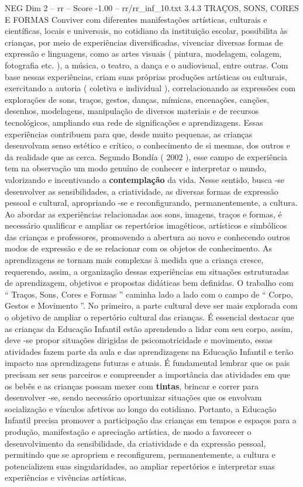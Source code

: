 \begin{textsample}{NEG Dim 2 – rr – Score -1.00 – rr/rr\_inf\_10.txt}  \label{ex:f2_neg_183}
3.4.3 TRAÇOS, SONS, CORES E FORMAS Conviver com diferentes manifestações artísticas, culturais e científicas, locais e universais, no cotidiano da instituição escolar, possibilita às crianças, por meio de experiências diversificadas, vivenciar diversas formas de expressão e linguagens, como as artes visuais ( pintura, modelagem, colagem, fotografia etc. ), a música, o teatro, a dança e o audiovisual, entre outras.
Com base nessas experiências, criam suas próprias produções artísticas ou culturais, exercitando a autoria ( coletiva e individual ), correlacionando as expressões com explorações de sons, traços, gestos, danças, mímicas, encenações, canções, desenhos, modelagens, manipulação de diversos materiais e de recursos tecnológicos, ampliando sua rede de significações e aprendizagens.
Essas experiências contribuem para que, desde muito pequenas, as crianças desenvolvam senso estético e crítico, o conhecimento de si mesmas, dos outros e da realidade que as cerca.
Segundo Bondía ( 2002 ), esse campo de experiência tem na observação um modo genuíno de conhecer e interpretar o mundo, valorizando e incentivando a \textbf{contemplação} da vida.
Nesse sentido, busca -se desenvolver as sensibilidades, a criatividade, as diversas formas de expressão pessoal e cultural, apropriando -se e reconfigurando, permanentemente, a cultura.
Ao abordar as experiências relacionadas aos sons, imagens, traços e formas, é necessário qualificar e ampliar os repertórios imagéticos, artísticos e simbólicos das crianças e professores, promovendo a abertura ao novo e conhecendo outros modos de expressão e de se relacionar com os objetos de conhecimento.
As aprendizagens se tornam mais complexas à medida que a criança cresce, requerendo, assim, a organização dessas experiências em situações estruturadas de aprendizagem, objetivos e propostas didáticas bem definidas.
O trabalho com “ Traços, Sons, Cores e Formas ” caminha lado a lado com o campo de “ Corpo, Gestos e Movimento ”.
No primeiro, a parte cultural deve ser mais explorada com o objetivo de ampliar o repertório cultural das crianças.
É essencial destacar que as crianças da Educação Infantil estão aprendendo a lidar com seu corpo, assim, deve -se propor situações dirigidas de psicomotricidade e movimento, essas atividades fazem parte da aula e das aprendizagens na Educação Infantil e terão impacto nas aprendizagens futuras e atuais.
É fundamental lembrar que os pais precisam ser seus parceiros e compreender a importância das atividades em que os bebês e as crianças possam mexer com \textbf{tintas}, brincar e correr para desenvolver -se, sendo necessário oportunizar situações que os envolvam socialização e vínculos afetivos ao longo do cotidiano.
Portanto, a Educação Infantil precisa promover a participação das crianças em tempos e espaços para a produção, manifestação e apreciação artística, de modo a favorecer o desenvolvimento da sensibilidade, da criatividade e da expressão pessoal, permitindo que se apropriem e reconfigurem, permanentemente, a cultura e potencializem suas singularidades, ao ampliar repertórios e interpretar suas experiências e vivências artísticas.

\end{textsample}
